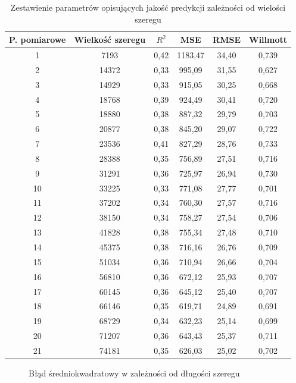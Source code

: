 \documentclass[10pt,a4paper]{article}
\begin{document}
\begin{table}[h!]
	\centering
	\begin{tabular}{|c|c|c|c|c|c|}
		\hline
		P. pomiarowe & Wielkość szeregu & $R^2$ & MSE & RMSE & Willmott \\
		\hline
		1  & 7193  & 0,42 & 1183,47 & 34,40 & 0,739 \\
		2  & 14372 & 0,33 & 995,09  & 31,55 & 0,627 \\
		3  & 14929 & 0,33 & 915,05  & 30,25 & 0,668 \\
		4  & 18768 & 0,39 & 924,49  & 30,41 & 0,720 \\
		5  & 18880 & 0,38 & 887,32  & 29,79 & 0,703 \\
		6  & 20877 & 0,38 & 845,20  & 29,07 & 0,722 \\
		7  & 23536 & 0,41 & 827,29  & 28,76 & 0,733 \\
		8  & 28388 & 0,35 & 756,89  & 27,51 & 0,716 \\
		9  & 31291 & 0,36 & 725,97  & 26,94 & 0,730 \\
		10 & 33225 & 0,33 & 771,08  & 27,77 & 0,701 \\
		11 & 37202 & 0,34 & 760,30  & 27,57 & 0,716 \\
		12 & 38150 & 0,34 & 758,27  & 27,54 & 0,706 \\
		13 & 41828 & 0,38 & 755,34  & 27,48 & 0,710 \\
		14 & 45375 & 0,38 & 716,16  & 26,76 & 0,709 \\
		15 & 51034 & 0,36 & 710,94  & 26,66 & 0,704 \\
		16 & 56810 & 0,36 & 672,12  & 25,93 & 0,707 \\
		17 & 60145 & 0,36 & 645,12  & 25,40 & 0,707 \\
		18 & 66146 & 0,35 & 619,71  & 24,89 & 0,691 \\
		19 & 68729 & 0,34 & 632,23  & 25,14 & 0,699 \\
		20 & 71207 & 0,36 & 643,43  & 25,37 & 0,711 \\
		21 & 74181 & 0,35 & 626,03  & 25,02 & 0,702 \\
		\hline
	\end{tabular}
	\caption{Zestawienie parametrów opisujących jakość predykcji  zależności od wielości szeregu}
	\label{table:scale_comparison}
\end{table}


\begin{figure}[!ht]
\centering
{}
\caption{Błąd średniokwadratowy w zależności od długości szeregu}
\label{figure:scale_mse}
\end{figure}
\FloatBarrier
\end{document}

